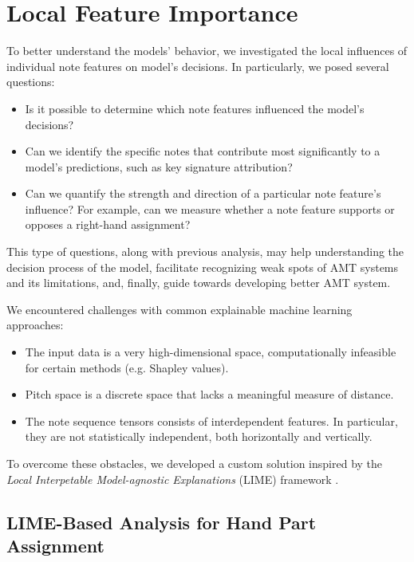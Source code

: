 \section{Local Feature Importance}

To better understand the models' behavior, we investigated the local influences of individual note features on model's decisions. In particularly, we posed several questions:

\begin{itemize}
	\item Is it possible to determine which note features influenced the model's decisions?
	\item Can we identify the specific notes that contribute most significantly to a model's predictions, such as key signature attribution?
	\item Can we quantify the strength and direction of a particular note feature's influence? For example, can we measure whether a note feature supports or opposes a right-hand assignment?
\end{itemize}

This type of questions, along with previous analysis, may help understanding the decision process of the model, facilitate recognizing weak spots of AMT systems and its limitations, and, finally, guide towards developing better AMT system.

We encountered challenges with common explainable machine learning approaches: 

\begin{itemize}
	\item The input data is a very high-dimensional space, computationally infeasible for certain methods (e.g. Shapley values).
	\item Pitch space is a discrete space that lacks a meaningful measure of distance.
	\item The note sequence tensors consists of interdependent features. In particular, they are not statistically independent, both horizontally and vertically.
\end{itemize}

To overcome these obstacles, we developed a custom solution inspired by the \emph{Local Interpetable Model-agnostic Explanations} (LIME) framework \cite{Ribeiro2016}.

\subsection{LIME-Based Analysis for Hand Part Assignment}

